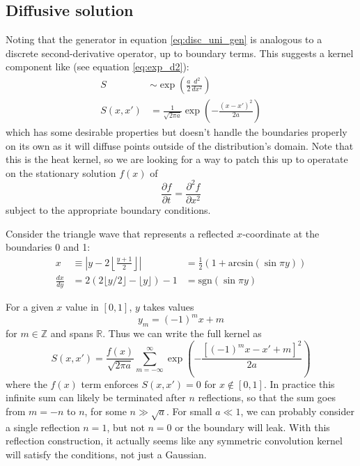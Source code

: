 \documentclass{article}
\begin{document}
\subsection{Diffusive solution}
Noting that the generator in equation \ref{eq:disc_uni_gen} is
analogous to a discrete second-derivative operator, up to boundary terms.
This suggests a kernel component like (see equation \ref{eq:exp_d2}):
  \begin{align}
    S &\sim \exp\left(\frac{a}{2}\frac{d^2}{dx^2}\right) \\
    S(x, x') &= \frac{1}{\sqrt{2\pi a}} \exp\left(-\frac{(x-x')^2}{2a}\right)
  \end{align}
which has some desirable properties but doesn't handle the boundaries properly
on its own as it will diffuse points outside of the distribution's domain. Note
that this is the heat kernel, so we are looking for a way to patch this up to
operatate on the stationary solution $f(x)$ of 
\begin{equation}
  \frac{\partial f}{\partial t} = \frac{\partial^2 f}{\partial x ^2} 
  \label{eq:heat}
\end{equation}
subject to the appropriate boundary conditions.

Consider the triangle wave that represents a reflected $x$-coordinate at the
boundaries 0 and 1:
\begin{align}
  x &\equiv \left| y - 2 \left\lfloor\frac{y+1}{2}\right\rfloor \right| &= \frac{1}{2} \left(1 + \textrm{arcsin}\left(\sin \pi y\right)\right) \\
  \frac{dx}{dy} &= 2\left(2\lfloor y/2\rfloor - \lfloor y \rfloor\right) - 1 &= \textrm{sgn}\left(\sin \pi y\right)
\end{align}

For a given $x$ value in $[0, 1]$, $y$ takes values
\begin{equation}
  y_m = (-1)^m x + m
\end{equation}
for $m \in \mathbb{Z}$ and spans $\mathbb{R}$. Thus we can write the full
kernel as
\begin{equation}
  S(x, x') = \frac{f(x)}{\sqrt{2\pi a}} \sum_{m=-\infty}^\infty \exp\left(-\frac{[(-1)^m x - x' + m]^2}{2a}\right)
\end{equation}
where the $f(x)$ term enforces $S(x, x') = 0$ for $x \notin [0, 1]$. In
practice this infinite sum can likely be terminated after $n$ reflections, so
that the sum goes from $m=-n$ to $n$, for some $n \gg \sqrt{a}$. For small $a
\ll 1$, we can probably consider a single reflection $n=1$, but not $n=0$ or
the boundary will leak. With this reflection construction, it actually seems
like any symmetric convolution kernel will satisfy the conditions, not just a
Gaussian.
\end{document}
